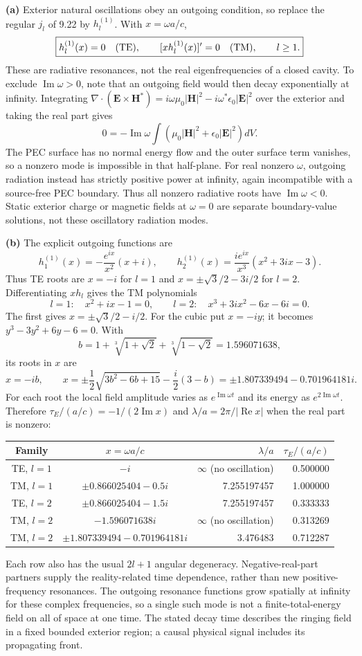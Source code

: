 \textbf{(a)} Exterior natural oscillations obey an outgoing condition,
so replace the regular $j_l$ of 9.22 by $h_l^{(1)}$. With $x=\omega a/c$,
\[
\boxed{h_l^{(1)}(x)=0\quad({\rm TE}),\qquad
[xh_l^{(1)}(x)]'=0\quad({\rm TM}),\qquad l\ge1.}
\]
These are radiative resonances, not the real eigenfrequencies of a closed
cavity. To exclude $\operatorname{Im}\omega>0$, note that an outgoing
field would then decay exponentially at infinity. Integrating
$\nabla\cdot(\mathbf E\times\mathbf H^*)=
 i\omega\mu_0|\mathbf H|^2-i\omega^*\epsilon_0|\mathbf E|^2$
over the exterior and taking the real part gives
\[
0=-\operatorname{Im}\omega\int
(\mu_0|\mathbf H|^2+\epsilon_0|\mathbf E|^2)dV.
\]
The PEC surface has no normal energy flow and the outer surface term
vanishes, so a nonzero mode is impossible in that half-plane.
For real nonzero $\omega$, outgoing radiation instead has strictly
positive power at infinity, again incompatible with a source-free PEC
boundary. Thus all nonzero radiative roots have
$\operatorname{Im}\omega<0$. Static exterior charge or magnetic fields
at $\omega=0$ are separate boundary-value solutions, not these oscillatory
radiation modes.

\textbf{(b)} The explicit outgoing functions are
\[
h_1^{(1)}(x)=-\frac{e^{ix}}{x^2}(x+i),\qquad
h_2^{(1)}(x)=\frac{ie^{ix}}{x^3}(x^2+3ix-3).
\]
Thus TE roots are $x=-i$ for $l=1$ and
$x=\pm\sqrt3/2-3i/2$ for $l=2$.
Differentiating $xh_l$ gives the TM polynomials
\[
l=1:\quad x^2+ix-1=0,
\qquad
l=2:\quad x^3+3ix^2-6x-6i=0.
\]
The first gives $x=\pm\sqrt3/2-i/2$.
For the cubic put $x=-iy$; it becomes
$y^3-3y^2+6y-6=0$. With
\[
b=1+\sqrt[3]{1+\sqrt2}+\sqrt[3]{1-\sqrt2}=1.596071638,
\]
its roots in $x$ are
\[
x=-ib,\qquad
x=\pm\frac12\sqrt{3b^2-6b+15}
-\frac i2(3-b)
=\pm1.807339494-0.701964181i.
\]
For each root the local field amplitude varies as
$e^{\operatorname{Im}\omega t}$ and its energy as
$e^{2\operatorname{Im}\omega t}$. Therefore
$\tau_E/(a/c)=-1/(2\operatorname{Im}x)$ and
$\lambda/a=2\pi/|\operatorname{Re}x|$ when the real part is nonzero:
\begin{center}
\begin{tabular}{ccrr}
\toprule
Family&$x=\omega a/c$&$\lambda/a$&$\tau_E/(a/c)$\\
\midrule
TE, $l=1$&$-i$&$\infty$ (no oscillation)&0.500000\\
TM, $l=1$&$\pm0.866025404-0.5i$&7.255197457&1.000000\\
TE, $l=2$&$\pm0.866025404-1.5i$&7.255197457&0.333333\\
TM, $l=2$&$-1.596071638i$&$\infty$ (no oscillation)&0.313269\\
TM, $l=2$&$\pm1.807339494-0.701964181i$&3.476483&0.712287\\
\bottomrule
\end{tabular}
\end{center}
Each row also has the usual $2l+1$ angular degeneracy. Negative-real-part
partners supply the reality-related time dependence, rather than new
positive-frequency resonances. The outgoing resonance functions grow
spatially at infinity for these complex frequencies, so a single such
mode is not a finite-total-energy field on all of space at one time.
The stated decay time describes the ringing field in a fixed bounded
exterior region; a causal physical signal includes its propagating front.
